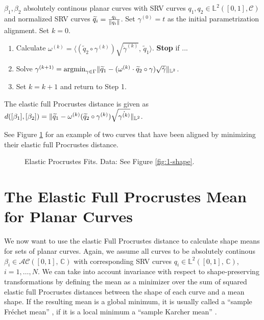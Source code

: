 \begin{algorithm}
  \label{alg:2-dist}
  $\beta_1, \beta_2$ absolutely continous planar curves with SRV curves $q_1, q_2 \in \mathbb{L}^2([0,1], \mathcal{C})$ and normalized SRV curves $\widetilde q_i = \frac{q_i}{\lVert q_i\rVert}$.
  Set $\gamma^{(0)} = t$  as the initial parametrization alignment.
  Set $k = 0$. 
  \begin{enumerate}
    \item Calculate $\omega^{(k)} = \langle (\widetilde q_2 \circ \gamma^{(k)}) \sqrt{\dot\gamma^{(k)}},\, \widetilde q_1 \rangle$. \textbf{Stop} if ...
    \item Solve $\gamma^{(k+1)} = \operatorname*{argmin}_{\gamma \in \Gamma} \lVert\widetilde q_1 - (\omega^{(k)} \cdot \widetilde q_2 \circ \gamma ) \sqrt{\dot\gamma}\rVert_{\mathbb{L}^2}$.
    \item Set $k = k+1$ and return to Step 1.
  \end{enumerate}
  The elastic full Procrustes distance is given as $d([\beta_1],[\beta_2]) = \lVert\widetilde q_1 - \omega^{(k)} ( \widetilde q_2 \circ \gamma^{(k)} ) \sqrt{\dot{\gamma^{(k)}}}\rVert_{\mathbb{L}^2}$.
\end{algorithm}

\noindent See Figure \ref{fig:2-elastic-pfit} for an example of two curves that have been aligned by minimizing their elastic full Procrustes distance.

\begin{figure}
  \centering
  \begin{subfigure}{.48\textwidth}
    \centering
  \end{subfigure}\hfill%
  \begin{subfigure}{.48\textwidth}
    \centering
  \end{subfigure}
  \caption{
    Elastic Procrustes Fits.
    Data: See Figure \ref{fig:1-shape}.}
  \label{fig:2-elastic-pfit}
\end{figure}


\section{The Elastic Full Procrustes Mean for Planar Curves}
\label{sec:2-mean}
We now want to use the elastic Full Procrustes distance to calculate shape means for sets of planar curves.
Again, we assume all curves to be absolutely continous $\beta_i \in \mathcal{AC}([0,1],\, \mathbb{C})$ with corresponding SRV curves $q_i \in \mathbb{L}^2([0,1],\, \mathbb{C})$, $i=1,\dots,N$.
We can take into account invariance with respect to shape-preserving transformations by defining the mean as a minimizer over the sum of squared elastic full Procrustes distances between the shape of each curve and a mean shape.
If the resulting mean is a global minimum, it is usually called a \enquote{sample Fr\'echet mean} \parencite{Frechet1948}, if it is a local minimum a \enquote{sample Karcher mean} \parencite{Karcher1977} \parencite[see][111]{DrydenMardia2016}.


